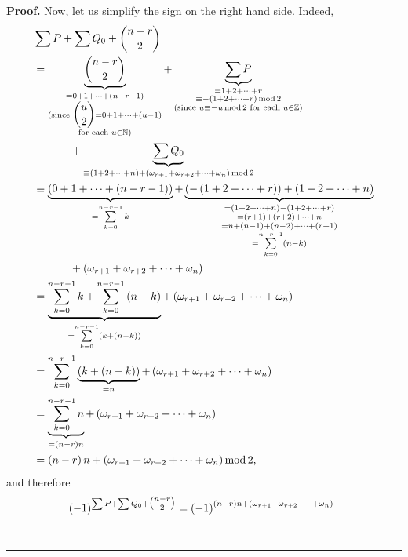 \documentclass[numbers=enddot,12pt,final,onecolumn,notitlepage]{scrartcl}%
\theoremstyle{definition}
\newenvironment{proof}[1][Proof]{\noindent\textbf{#1.} }{\ \rule{0.5em}{0.5em}}
\let\sumnonlimits\sum
\renewcommand{\sum}{\sumnonlimits\limits}
\begin{document}
\begin{enumerate}
\begin{proof}
Now, let us simplify the sign on the right hand side. Indeed,%
\begin{align*}
&  \sum P+\sum Q_{0}+\dbinom{n-r}{2}\\
&  =\underbrace{\dbinom{n-r}{2}}_{\substack{=0+1+\cdots+\left(  n-r-1\right)
\\\text{(since }\dbinom{u}{2}=0+1+\cdots+\left(  u-1\right)  \\\text{for each
}u\in\mathbb{N}\text{)}}}+\underbrace{\sum P}_{\substack{=1+2+\cdots
+r\\\equiv-\left(  1+2+\cdots+r\right)  \operatorname{mod}2\\\text{(since
}u\equiv-u\operatorname{mod}2\text{ for each }u\in\mathbb{Z}\text{)}}}\\
&  \ \ \ \ \ \ \ \ \ \ +\underbrace{\sum Q_{0}}_{\equiv\left(  1+2+\cdots
+n\right)  +\left(  \omega_{r+1}+\omega_{r+2}+\cdots+\omega_{n}\right)
\operatorname{mod}2}\\
&  \equiv\underbrace{\left(  0+1+\cdots+\left(  n-r-1\right)  \right)
}_{=\sum_{k=0}^{n-r-1}k}+\underbrace{\left(  -\left(  1+2+\cdots+r\right)
\right)  +\left(  1+2+\cdots+n\right)  }_{\substack{=\left(  1+2+\cdots
+n\right)  -\left(  1+2+\cdots+r\right)  \\=\left(  r+1\right)  +\left(
r+2\right)  +\cdots+n\\=n+\left(  n-1\right)  +\left(  n-2\right)
+\cdots+\left(  r+1\right)  \\=\sum_{k=0}^{n-r-1}\left(  n-k\right)  }}\\
&  \ \ \ \ \ \ \ \ \ \ +\left(  \omega_{r+1}+\omega_{r+2}+\cdots+\omega
_{n}\right) \\
&  =\underbrace{\sum_{k=0}^{n-r-1}k+\sum_{k=0}^{n-r-1}\left(  n-k\right)
}_{=\sum_{k=0}^{n-r-1}\left(  k+\left(  n-k\right)  \right)  }+\left(
\omega_{r+1}+\omega_{r+2}+\cdots+\omega_{n}\right) \\
&  =\sum_{k=0}^{n-r-1}\underbrace{\left(  k+\left(  n-k\right)  \right)
}_{=n}+\left(  \omega_{r+1}+\omega_{r+2}+\cdots+\omega_{n}\right) \\
&  =\underbrace{\sum_{k=0}^{n-r-1}n}_{=\left(  n-r\right)  n}+\left(
\omega_{r+1}+\omega_{r+2}+\cdots+\omega_{n}\right) \\
&  =\left(  n-r\right)  n+\left(  \omega_{r+1}+\omega_{r+2}+\cdots+\omega
_{n}\right)  \operatorname{mod}2,
\end{align*}
and therefore%
\[
\left(  -1\right)  ^{\sum P+\sum Q_{0}+\tbinom{n-r}{2}}=\left(  -1\right)
^{\left(  n-r\right)  n+\left(  \omega_{r+1}+\omega_{r+2}+\cdots+\omega
_{n}\right)  }.
\]
\end{proof}
\end{enumerate}
\end{document}
